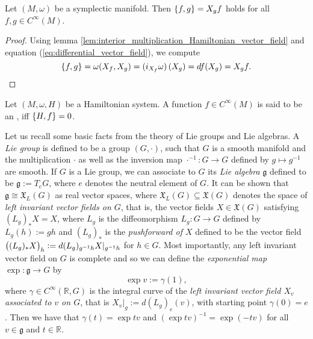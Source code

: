 \begin{lemma}
	\label{lem:Poisson_bracket_equivalent}
	Let $(M,\omega)$ be a symplectic manifold. Then $\cbr{f,g} = X_gf$ holds for all $f,g \in C^\infty(M)$.
\end{lemma}

\begin{proof}
	Using lemma \ref{lem:interior_multiplication_Hamiltonian_vector_field} and equation (\ref{eq:differential_vector_field}), we compute
	\begin{equation*}
		\cbr{f,g} = \omega(X_f,X_g) = \del[0]{i_{X_f}\omega}(X_g) = df(X_g) = X_g f.
	\end{equation*}
\end{proof}

\begin{definition}
	Let $(M,\omega,H)$ be a Hamiltonian system. A function $f \in C^\infty(M)$ is said to be an , iff $\cbr{H,f} = 0$.
\end{definition}

Let us recall some basic facts from the theory of Lie groups and Lie algebras. A \emph{Lie group} is defined to be a group $(G,\cdot)$, such that $G$ is a smooth manifold and the multiplication $\cdot$ as well as the inversion map $\cdot^{-1} : G \to G$ defined by $g\mapsto g^{-1}$ are smooth. If $G$ is a Lie group, we can associate to $G$ its \emph{Lie algebra} $\mathfrak{g}$ defined to be $\mathfrak{g} := T_eG$, where $e$ denotes the neutral element of $G$. It can be shown that $\mathfrak{g} \cong \mathfrak{X}_L(G)$ as real vector spaces, where $\mathfrak{X}_L(G) \subseteq \mathfrak{X}(G)$ denotes the space of \emph{left invariant vector fields on $G$}, that is, the vector fields $X \in \mathfrak{X}(G)$ satisfying $(L_g)_* X = X$, where $L_g$ is the diffeomorphism $L_g : G \to G$ defined by $L_g(h) := gh$ and $(L_g)_*$ is the \emph{pushforward of $X$} defined to be the vector field $\del[1]{(L_g)_*X}_h := d(L_g)_{g^{-1}h}X\vert_{g^{-1}h}$ for $h \in G$. Most importantly, any left invariant vector field on $G$ is complete and so we can define the \emph{exponential map} $\exp : \mathfrak{g} \to G$ by 
\begin{equation*}
	\exp v := \gamma(1),
\end{equation*}
\noindent where $\gamma \in C^\infty(\mathbb{R},G)$ is the integral curve of the \emph{left invariant vector field $X_v$ associated to $v$ on $G$}, that is $X_v\vert_g := d(L_g)_e(v)$, with starting point $\gamma(0) = e$. Then we have that $\gamma(t) = \exp tv$ and $(\exp tv)^{-1} = \exp (-tv)$ for all $v \in \mathfrak{g}$ and $t \in \mathbb{R}$.

